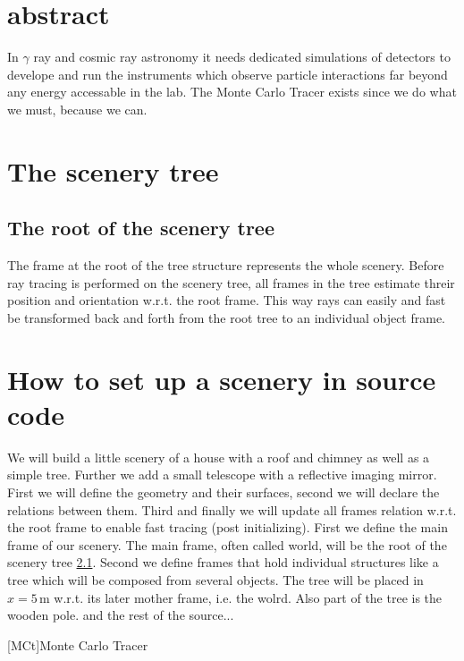\documentclass[11pt,a4paper,oneside,titlepage]{book}
\begin{document}
\chapter{abstract}
%
In $\gamma$ ray and cosmic ray astronomy it needs dedicated simulations of detectors to develope and run the instruments which observe particle interactions far beyond any energy accessable in the lab.
%
The Monte Carlo Tracer exists since we do what we must, because we can.
\chapter{The scenery tree}
\blindtext[2]
\section{The root of the scenery tree}
\label{SubSecRootFrame}
The frame at the root of the tree structure represents the whole scenery.
%
Before ray tracing is performed on the scenery tree, all frames in the tree estimate threir position and orientation w.r.t. the root frame.
%
This way rays can easily and fast be transformed back and forth from the root tree to an individual object frame.
\chapter{How to set up a scenery in source code}
%
We will build a little scenery of a house with a roof and chimney as well as a simple tree. Further we add a small telescope with a reflective imaging mirror.
%
First we will define the geometry and their surfaces, second we will declare the relations between them. Third and finally we will update all frames relation w.r.t. the root frame to enable fast tracing (post initializing).
% 
%
First we define the main frame of our scenery. The main frame, often called world, will be the root of the scenery tree \ref{SubSecRootFrame}. 
%
%
Second we define frames that hold individual structures like a tree which will be composed from several objects. The tree will be placed in $x=5\,$m w.r.t. its later mother frame, i.e. the wolrd. 
%
Also part of the tree is the wooden pole.
and the rest of the source...

\renewcommand{\bibname}{References}

  
\addcontentsline{toc}{chapter}{\bibname}
%
\begin{acronym}
    [MCt]{Monte Carlo Tracer}
\end{acronym}
\end{document}
